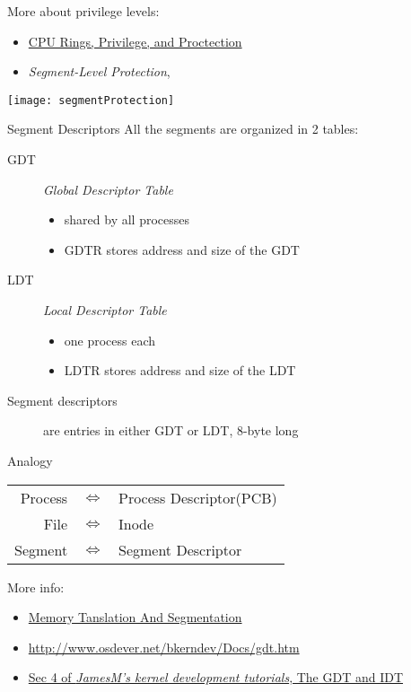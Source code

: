 More about privilege levels:
\begin{itemize}
\item \href{http://duartes.org/gustavo/blog/post/cpu-rings-privilege-and-protection}{CPU
    Rings, Privilege, and Proctection}
\item \emph{Segment-Level Protection}, \cite[Sec 6.3]{intel86}
\end{itemize}
\begin{center}
  \texttt{[image: segmentProtection]}
\end{center}

\begin{frame}{Segment Descriptors}
    All the segments are organized in 2 tables:
    \begin{description}
    \item[GDT] \emph{Global Descriptor Table}
      \begin{itemize}
      \item shared by all processes
      \item GDTR stores address and size of the GDT
      \end{itemize}
    \item[LDT] \emph{Local Descriptor Table}
      \begin{itemize}
      \item one process each
      \item LDTR stores address and size of the LDT
      \end{itemize}
    \item[Segment descriptors] are entries in either GDT or LDT, 8-byte long
    \end{description}
      \begin{block}{Analogy}
        \begin{center}
          \begin{tabular}{rcl}
            Process&$\Longleftrightarrow$&Process Descriptor(PCB)\\
            File&$\Longleftrightarrow$&Inode\\
            Segment&$\Longleftrightarrow$&Segment Descriptor
          \end{tabular}
        \end{center}
      \end{block}
\end{frame}

More info:
\begin{itemize}
\item
  \href{http://duartes.org/gustavo/blog/post/memory-translation-and-segmentation}{Memory
    Tanslation And Segmentation}
\item \url{http://www.osdever.net/bkerndev/Docs/gdt.htm}
\item
  \href{http://www.jamesmolloy.co.uk/tutorial_html/4.-The\%20GDT\%20and\%20IDT.html}{Sec 4
    of \emph{JamesM's kernel development tutorials}, The GDT and IDT}
\end{itemize}

